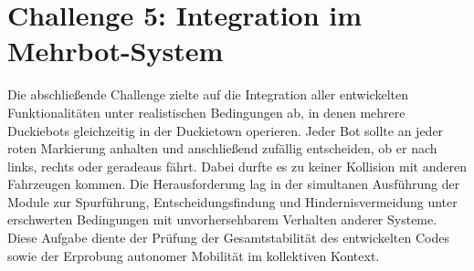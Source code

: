 \chapter{Challenge 5: Integration im Mehrbot-System}
\label{ch:Challenge_5}

Die abschließende Challenge zielte auf die Integration aller entwickelten Funktionalitäten unter realistischen 
Bedingungen ab, in denen mehrere Duckiebots gleichzeitig in der Duckietown operieren. Jeder Bot sollte an jeder 
roten Markierung anhalten und anschließend zufällig entscheiden, ob er nach links, rechts oder geradeaus fährt. 
Dabei durfte es zu keiner Kollision mit anderen Fahrzeugen kommen. Die Herausforderung lag in der simultanen Ausführung 
der Module zur Spurführung, Entscheidungsfindung und Hindernisvermeidung unter erschwerten Bedingungen mit 
unvorhersehbarem Verhalten anderer Systeme. Diese Aufgabe diente der Prüfung der Gesamtstabilität des entwickelten 
Codes sowie der Erprobung autonomer Mobilität im kollektiven Kontext. 